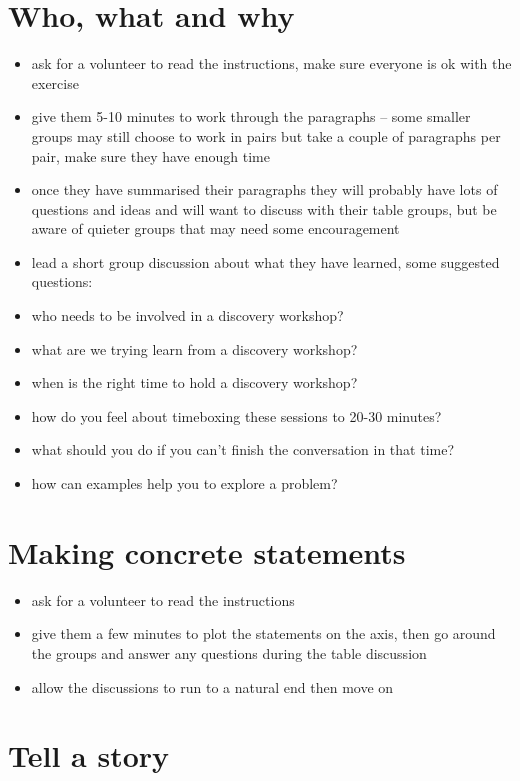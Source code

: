 \section*{Who, what and why}

\begin{itemize}
    \item ask for a volunteer to read the instructions, make sure everyone is ok with the exercise
    \item give them 5-10 minutes to work through the paragraphs – some smaller groups may still choose to work in pairs but take a couple of paragraphs per pair, make sure they have enough time
    \item once they have summarised their paragraphs they will probably have lots of questions and ideas and will want to discuss with their table groups, but be aware of quieter groups that may need some encouragement
    \item lead a short group discussion about what they have learned, some suggested questions:
    \item who needs to be involved in a discovery workshop?
    \item what are we trying learn from a discovery workshop?
    \item when is the right time to hold a discovery workshop?
    \item how do you feel about timeboxing these sessions to 20-30 minutes?
    \item what should you do if you can't finish the conversation in that time?
    \item how can examples help you to explore a problem?
\end{itemize}

\section*{Making concrete statements}
\begin{itemize}
    \item ask for a volunteer to read the instructions
    \item give them a few minutes to plot the statements on the axis, then go around the groups and answer any questions during the table discussion
    \item allow the discussions to run to a natural end then move on
\end{itemize}

\section*{Tell a story}

